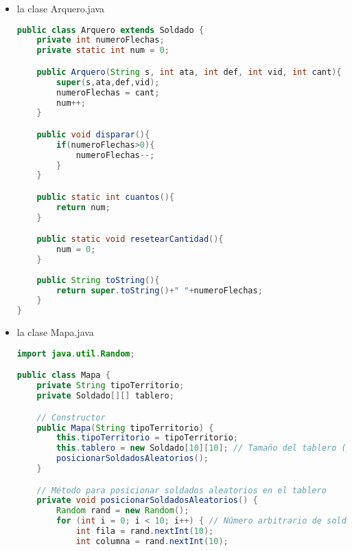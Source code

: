 \documentclass{article}
\begin{document}
\begin{itemize}
\begin{itemize}
\begin{lstlisting}[language=java]
    public Espadachin(String s, int ata, int def, int vid, int lon){
        super(s,ata,def,vid);
        longitudEspada = lon;
        num++;
    }

    public void muroEscudos(){
        if(muroEscudos == true ){
            muroEscudos = false;
        }else{
            muroEscudos = true;
        }
    }

    public static int cuantos(){
        return num;
    }

    public static void resetearCantidad(){
        num =0;
    }

    public String toString(){
        return super.toString()+" "+longitudEspada+" "+muroEscudos;
    }
}
        \end{lstlisting}

                \item la clase Arquero.java
        \begin{lstlisting}[language=java]
public class Arquero extends Soldado {
    private int numeroFlechas;
    private static int num = 0;

    public Arquero(String s, int ata, int def, int vid, int cant){
        super(s,ata,def,vid);
        numeroFlechas = cant;
        num++;
    }

    public void disparar(){
        if(numeroFlechas>0){
            numeroFlechas--;
        }
    }

    public static int cuantos(){
        return num;
    }

    public static void resetearCantidad(){
        num = 0;
    }
    
    public String toString(){
        return super.toString()+" "+numeroFlechas;
    }
}

        \end{lstlisting}

                \item la clase Mapa.java
        \begin{lstlisting}[language=java]
import java.util.Random;

public class Mapa {
    private String tipoTerritorio;
    private Soldado[][] tablero;

    // Constructor
    public Mapa(String tipoTerritorio) {
        this.tipoTerritorio = tipoTerritorio;
        this.tablero = new Soldado[10][10]; // Tamaño del tablero (puedes ajustarlo según tus necesidades)
        posicionarSoldadosAleatorios();
    }

    // Método para posicionar soldados aleatorios en el tablero
    private void posicionarSoldadosAleatorios() {
        Random rand = new Random();
        for (int i = 0; i < 10; i++) { // Número arbitrario de soldados por ejército
            int fila = rand.nextInt(10);
            int columna = rand.nextInt(10);


\end{lstlisting}
\end{itemize}
\end{itemize}
\end{document}
